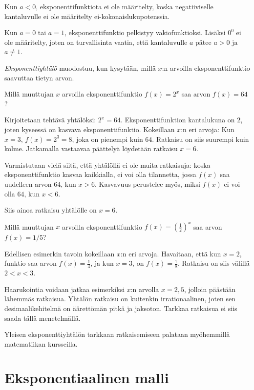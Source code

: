 Kun $a<0$, eksponenttifunktiota ei ole määritelty, koska negatiiviselle
kantaluvulle ei ole määritelty ei-kokonaislukupotenssia.

Kun $a=0$ tai $a=1$, eksponenttifunktio pelkistyy vakiofunktioksi.
Lisäksi $0^0$ ei ole määritelty, joten on turvallisinta vaatia, että
kantaluvulle $a$ pätee $a>0$ ja $a \neq 1$.

\emph{Eksponenttiyhtälö} muodostuu, kun kysytään, millä $x$:n arvoilla eksponenttifunktio saavuttaa tietyn arvon.

\begin{esimerkki}
Millä muuttujan $x$ arvoilla eksponenttifunktio $f(x) = 2^x$ saa arvon
$f(x) = 64$?

Kirjoitetaan tehtävä yhtälöksi: $2^x = 64$.
Eksponenttifunktion kantalukuna on $2$, joten kyseessä on kasvava
eksponenttifunktio. Kokeillaan $x$:n eri arvoja: Kun $x = 3$,
$f(x) = 2^3 = 8$, joka on pienempi kuin $64$. Ratkaisu on siis
suurempi kuin kolme. Jatkamalla vastaavaa päättelyä löydetään ratkaisu
$x = 6$.

Varmistutaan vielä siitä, että yhtälöllä ei ole muita ratkaisuja:
koska eksponenttifunktio kasvaa kaikkialla, ei voi olla tilannetta, jossa
$f(x)$ saa uudelleen arvon $64$, kun $x > 6$. Kasvavuus perustelee
myös, miksi $f(x)$ ei voi olla $64$, kun $x < 6$.

Siis ainoa ratkaisu yhtälölle on $x = 6$.
\end{esimerkki}

\begin{esimerkki}
Millä muuttujan $x$ arvoilla eksponenttifunktio
$f(x) = \left( \frac{1}{2} \right)^{x}$ saa arvon
$f(x) = 1/5$?

Edellisen esimerkin tavoin kokeillaan $x$:n eri arvoja. Havaitaan,
että kun $x = 2$, funktio saa arvon $f(x) = \frac{1}{4}$, ja
kun $x = 3$, on $f(x) = \frac{1}{8}$. Ratkaisu on siis välillä
$2 < x < 3$.

Haarukointia voidaan jatkaa esimerkiksi $x$:n arvolla $x = 2,5$,
jolloin päästään lähemmäs ratkaisua. Yhtälön ratkaisu on kuitenkin
irrationaalinen, joten sen desimaalikehitelmä on äärettömän pitkä ja
jaksoton. Tarkkaa ratkaisua ei siis saada tällä menetelmällä.

Yleisen eksponenttiyhtälön tarkkaan ratkaisemiseen palataan myöhemmillä
matematiikan kursseilla.
\end{esimerkki}


\section{Eksponentiaalinen malli}

